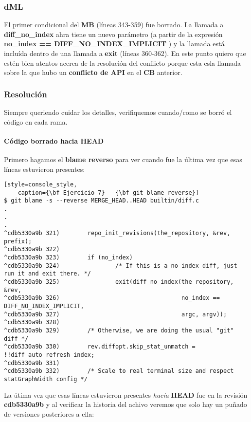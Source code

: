 \subsubsection*{dML}
El primer condicional del {\bf MB} (líneas 343-359) fue borrado. La llamada a {\bf diff\_no\_index} ahra tiene un
nuevo parámetro (a partir de la expresión {\bf no\_index == DIFF\_NO\_INDEX\_IMPLICIT }) y la llamada está incluída
dentro de una llamada a {\bf exit} (líneas 360-362). En este punto quiero que estén bien atentos acerca de la resolución del
conflicto porque esta esla llamada sobre la que hubo un {\bf conflicto de API} en el {\bf CB} anterior.

\subsubsection*{Resolución}

Siempre queriendo cuidar los detalles, verifiquemos cuando/como se borró el código en cada rama.

\paragraph{Código borrado hacia HEAD}
Primero hagamos el {\bf blame reverso} para ver cuando fue la última vez que esas líneas estuvieron presentes:

\begin{lstlisting}[style=console_style,
	caption={\bf Ejercicio 7} - {\bf git blame reverse}]
$ git blame -s --reverse MERGE_HEAD..HEAD builtin/diff.c
.
.
.
^cdb5330a9b 321)        repo_init_revisions(the_repository, &rev, prefix);
^cdb5330a9b 322) 
^cdb5330a9b 323)        if (no_index)
^cdb5330a9b 324)                /* If this is a no-index diff, just run it and exit there. */
^cdb5330a9b 325)                exit(diff_no_index(the_repository, &rev,
^cdb5330a9b 326)                                   no_index == DIFF_NO_INDEX_IMPLICIT,
^cdb5330a9b 327)                                   argc, argv));
^cdb5330a9b 328) 
^cdb5330a9b 329)        /* Otherwise, we are doing the usual "git" diff */
^cdb5330a9b 330)        rev.diffopt.skip_stat_unmatch = !!diff_auto_refresh_index;
^cdb5330a9b 331) 
^cdb5330a9b 332)        /* Scale to real terminal size and respect statGraphWidth config */
\end{lstlisting}

La útima vez que esas líneas estuvieron presentes {\it hacia} {\bf HEAD} fue en la revisión {\bf cdb5330a9b} y al verificar la historia
del achivo veremos que solo hay un puñado de versiones posteriores a ella:

